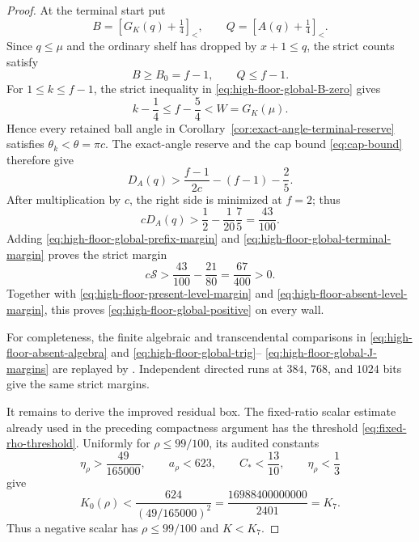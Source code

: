 \documentclass[11pt]{article}
\theoremstyle{remark}
\newcommand{\sbr}[1]{[#1]_{<}}
\begin{document}
\begin{proof}
At the terminal start put
\[
 B=\sbr{G_K(q)+\tfrac14},\qquad
 Q=\sbr{A(q)+\tfrac14}.
\]
Since $q\leq\mu$ and the ordinary shelf has dropped by $x+1\leq q$,
the strict counts satisfy
\begin{equation}
 B\geq B_0=f-1,\qquad Q\leq f-1.
 \label{eq:high-floor-global-terminal-counts}
\end{equation}
For $1\leq k\leq f-1$, the strict inequality in
\eqref{eq:high-floor-global-B-zero} gives
\[
 k-\frac14\leq f-\frac54<W=G_K(\mu).
\]
Hence every retained ball angle in
Corollary~\ref{cor:exact-angle-terminal-reserve} satisfies
$\theta_k<\theta=\pi c$.  The exact-angle reserve and the cap bound
\eqref{eq:cap-bound} therefore give
\begin{equation}
 D_A(q)>
 \frac{f-1}{2c}-(f-1)-\frac25.
 \label{eq:high-floor-global-terminal-payment}
\end{equation}
After multiplication by $c$, the right side is minimized at $f=2$;
thus
\begin{equation}
 cD_A(q)>\frac12-\frac1{20}\frac75=\frac{43}{100}.
 \label{eq:high-floor-global-terminal-margin}
\end{equation}
Adding \eqref{eq:high-floor-global-prefix-margin} and
\eqref{eq:high-floor-global-terminal-margin} proves the strict margin
\begin{equation}
 \boxed{c\mathcal S>\frac{43}{100}-\frac{21}{80}
 =\frac{67}{400}>0.}
 \label{eq:high-floor-global-final-margin}
\end{equation}
Together with \eqref{eq:high-floor-present-level-margin} and
\eqref{eq:high-floor-absent-level-margin}, this proves
\eqref{eq:high-floor-global-positive} on every wall.

For completeness, the finite algebraic and transcendental comparisons
in \eqref{eq:high-floor-absent-algebra} and
\eqref{eq:high-floor-global-trig}--
\eqref{eq:high-floor-global-J-margins} are replayed by
.  Independent
directed runs at $384$, $768$, and $1024$ bits give the same strict
margins.

It remains to derive the improved residual box.  The fixed-ratio scalar
estimate already used in the preceding compactness argument has the
threshold \eqref{eq:fixed-rho-threshold}.  Uniformly for
$\rho\leq99/100$, its audited constants
\[
 \eta_\rho>\frac{49}{165000},\qquad
 a_\rho<623,\qquad C_*<\frac{13}{10},
 \qquad \eta_\rho<\frac13
\]
give
\begin{equation}
 K_0(\rho)<\frac{624}{(49/165000)^2}
 =\frac{16988400000000}{2401}=K_7.
 \label{eq:high-floor-round-seven-cutoff}
\end{equation}
Thus a negative scalar has $\rho\leq99/100$ and $K<K_7$.


\end{proof}
\end{document}
